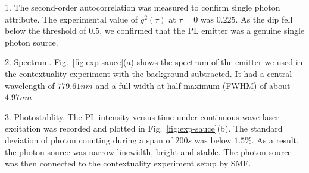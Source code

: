 \documentclass[pra,aps,notitlepage,superscriptaddress,showpacs,showkeys]{revtex4-1}
\theoremstyle{definition}
\theoremstyle{remark}
\begin{document}
 1. The second-order autocorrelation was measured to confirm single photon attribute. The experimental value of $g^2(\tau)$ at $\tau = 0$ was $0.225$. As the dip fell below the threshold of $0.5$, we confirmed that the PL emitter was a genuine single photon source.

 2. Spectrum. Fig.~\ref{fig:exp-sauce}(a) shows the spectrum of the emitter we used in the contextuality experiment with the background subtracted. It had a central wavelength of $779.61nm$ and a full width at half maximum (FWHM) of about $4.97nm$.

 3. Photostablity. The PL intensity versus time under continuous wave laser excitation was recorded and plotted in Fig.~\ref{fig:exp-sauce}(b). The standard deviation of photon counting during a span of $200s$ was below $1.5\%$.
 As a result, the photon source was narrow-linewidth, bright and stable. The photon source was then connected to the contextuality experiment setup by SMF.
\end{document}
